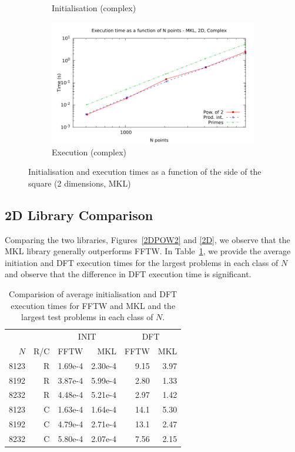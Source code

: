 \documentclass[12pt, a4paper]{article} \setlength{\textheight}{24cm}
\begin{document}
\begin{figure}[H]
\begin{subfigure}{.5\textwidth}
    \caption{Initialisation (complex)}
    \label{2DMKLCI}
  \end{subfigure}%
  \begin{subfigure}{.5\textwidth}
    \centering
    \includegraphics[width=.9\linewidth]{graphs/2d-mkl-exec-c.pdf}
    \caption{Execution (complex)}
    \label{2DMKLC}
  \end{subfigure}
  \caption{Initialisation and execution times as a function of the
    side of the square (2 dimensions, MKL)}
  \label{2DMKL}
\end{figure}






\subsection{2D Library Comparison}
Comparing the two libraries, Figures~\ref{2DPOW2} and \ref{2D}, we
observe that the MKL library generally outperforms FFTW. In
Table~\ref{Tbl:2D}, we provide the average initiation and DFT
execution times for the largest problems in each class of $N$ and
observe that the difference in DFT execution time is significant.


\begin{table}[H]
  \centering
  \begin{tabular}{|rr|rr|rr|}
    \hline
    \multicolumn{2}{|c|}{ }& \multicolumn{2}{|c|}{INIT } & \multicolumn{2}{|c|}{DFT }  \\
     $N$ & R/C & FFTW & MKL & FFTW & MKL \\
    \hline
    \hline
    8123 & R & 1.69e-4 & 2.30e-4 & 9.15 & 3.97 \\
    8192 & R & 3.87e-4 & 5.99e-4 &  2.80 & 1.33  \\ 
    8232 & R & 4.48e-4 & 5.21e-4 & 2.97 & 1.42 \\  
\hline
    8123 & C & 1.63e-4 & 1.64e-4 & 14.1 & 5.30 \\
    8192 & C & 4.79e-4 & 2.71e-4 & 13.1 & 2.47 \\
    8232 & C & 5.80e-4 & 2.07e-4 & 7.56 & 2.15 \\
\hline
  \end{tabular}
  \caption{Comparision of average initialisation and DFT execution times for FFTW and MKL and the largest test problems in each class of $N.$}\label{Tbl:2D}
\end{table}
\end{document}

